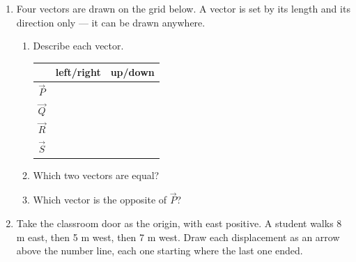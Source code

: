 \documentclass[12pt, twoside]{article}
\begin{document}
\begin{enumerate}[itemsep=0.5cm]
\item Four vectors are drawn on the grid below. A vector is set by its length and its
  direction only --- it can be drawn anywhere.

  \begin{minipage}[t]{0.47\linewidth}
    \vspace{0pt}
    \centering
  \end{minipage}
  \hfill
  \begin{minipage}[t]{0.49\linewidth}
    \vspace{0pt}
    \begin{enumerate}[itemsep=0.5cm]
      \item Describe each vector.

        \vspace{0.1cm}
        \renewcommand{\arraystretch}{1.6}
        \begin{tabular}{| c | c | c |}
          \hline
          & left/right & up/down \\ \hline
          $\vec{P}$ & & \\ \hline
          $\vec{Q}$ & & \\ \hline
          $\vec{R}$ & & \\ \hline
          $\vec{S}$ & & \\ \hline
        \end{tabular}
      \item Which two vectors are equal?
      \item Which vector is the opposite of $\vec{P}$?
    \end{enumerate}
  \end{minipage}

\newpage

\item Take the classroom door as the origin, with east positive. A student walks
  8 m east, then 5 m west, then 7 m west. Draw each displacement as an arrow above the
  number line, each one starting where the last one ended.


\end{enumerate}
\end{document}
